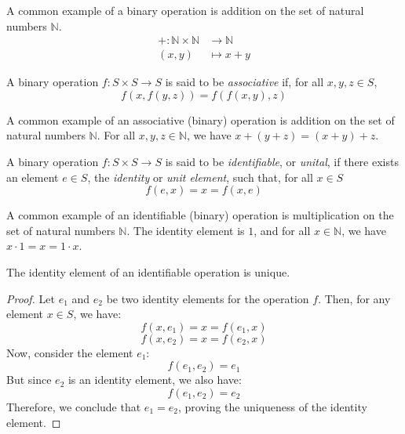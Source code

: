 \documentclass[11pt,fleqn]{book} %
\begin{document}
\begin{example}
    A common example of a binary operation is addition on the set of natural numbers $\mathbb{N}$.
    \begin{equation}
        \begin{split}
            + : \mathbb{N} \times \mathbb{N} & \to \mathbb{N} \\ (x,y) &\mapsto x+y
        \end{split}
    \end{equation}
\end{example}

\begin{definition}
    A binary operation $f: S \times S \to S$ is said to be \emph{associative} if, for all $x,y,z \in S$, 
    \[ f(x,f(y,z)) = f(f(x,y),z) \]
\end{definition}

\begin{example}
    A common example of an associative (binary) operation is addition on the set of natural numbers $\mathbb{N}$. For all $x,y,z \in \mathbb{N}$, we have $x + (y + z) = (x + y) + z$.
\end{example}

\begin{definition}
    A binary operation $f: S \times S \to S$ is said to be \emph{identifiable}, or \emph{unital}, if there exists an element $e \in S$, the \emph{identity} or \emph{unit element}, such that, for all $x \in S$
    \[ f(e,x) = x = f(x,e) \]
\end{definition}

\begin{example}
    A common example of an identifiable (binary) operation is multiplication on the set of natural numbers $\mathbb{N}$. The identity element is $1$, and for all $x \in \mathbb{N}$, we have $x \cdot 1 = x = 1 \cdot x$.
\end{example}

\begin{proposition}
    The identity element of an identifiable operation is unique.
\end{proposition}

\begin{proof}
    Let $e_1$ and $e_2$ be two identity elements for the operation $f$. Then, for any element $x \in S$, we have:
    \[ f(x,e_1) = x = f(e_1,x) \]
    \[ f(x,e_2) = x = f(e_2,x) \]
    Now, consider the element $e_1$:
    \[ f(e_1,e_2) = e_1 \]
    But since $e_2$ is an identity element, we also have:
    \[ f(e_1,e_2) = e_2 \]
    Therefore, we conclude that $e_1 = e_2$, proving the uniqueness of the identity element.
\end{proof}
\end{document}
